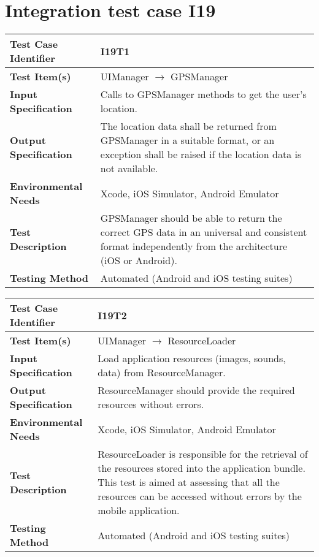 \vspace{2em}

\section{Integration test case I19}

\begin{tabular}{l p{}}
    \hline
    \textbf{Test Case Identifier} & I19T1\\
    \hline
    \textbf{Test Item(s)} & UIManager $\rightarrow$ GPSManager \\
    \hline
    \textbf{Input Specification} & Calls to GPSManager methods to get the user's location. \\
    \hline
    \textbf{Output Specification} & The location data shall be returned from GPSManager in a suitable format, or an exception shall be raised if the location data is not available. \\
    \hline
    \textbf{Environmental Needs} & Xcode, iOS Simulator, Android Emulator\\
    \hline
    \textbf{Test Description} & GPSManager should be able to return the correct GPS data in an universal and consistent format independently from the architecture (iOS or Android).\\
    \hline
    \textbf{Testing Method} & Automated (Android and iOS testing suites) \\
    \hline
\end{tabular}

\vspace{2em}

\noindent\begin{tabular}{l p{}}
    \hline
    \textbf{Test Case Identifier} & I19T2\\
    \hline
    \textbf{Test Item(s)} & UIManager $\rightarrow$ ResourceLoader \\
    \hline
    \textbf{Input Specification} & Load application resources (images, sounds, data) from ResourceManager. \\
    \hline
    \textbf{Output Specification} & ResourceManager should provide the required resources without errors. \\
    \hline
    \textbf{Environmental Needs} & Xcode, iOS Simulator, Android Emulator\\
    \hline
    \textbf{Test Description} & ResourceLoader is responsible for the retrieval of the resources stored into the application bundle.
    This test is aimed at assessing that all the resources can be accessed without errors by the mobile application. \\
    \hline
    \textbf{Testing Method} & Automated (Android and iOS testing suites) \\
    \hline
\end{tabular}

